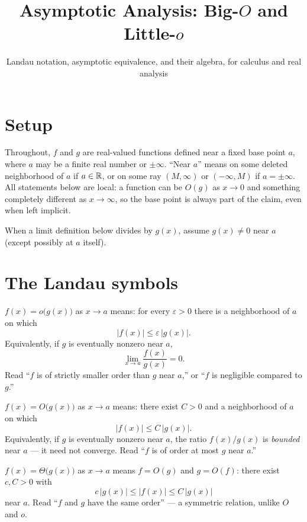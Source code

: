 \documentclass{essay}
\title{Asymptotic Analysis: Big-$O$ and Little-$o$}
\subtitle{Landau notation, asymptotic equivalence, and their algebra, for calculus and real analysis}
\author{}
\date{}
\begin{document}
\maketitle

\section{Setup}

Throughout, $f$ and $g$ are real-valued functions defined near a fixed base point $a$, where $a$ may be a finite real number or $\pm\infty$. ``Near $a$'' means on some deleted neighborhood of $a$ if $a\in\mathbb{R}$, or on some ray $(M,\infty)$ or $(-\infty,M)$ if $a=\pm\infty$. All statements below are local: a function can be $O(g)$ as $x\to 0$ and something completely different as $x\to\infty$, so the base point is always part of the claim, even when left implicit.

\begin{note}
When a limit definition below divides by $g(x)$, assume $g(x)\neq 0$ near $a$ (except possibly at $a$ itself).
\end{note}

\section{The Landau symbols}

\begin{definition}[Little-$o$]
$f(x) = o\big(g(x)\big)$ as $x\to a$ means: for every $\varepsilon>0$ there is a neighborhood of $a$ on which
\[
  |f(x)| \le \varepsilon\,|g(x)|.
\]
Equivalently, if $g$ is eventually nonzero near $a$,
\[
  \lim_{x\to a} \frac{f(x)}{g(x)} = 0.
\]
Read ``$f$ is of strictly smaller order than $g$ near $a$,'' or ``$f$ is negligible compared to $g$.''
\end{definition}

\begin{definition}[Big-$O$]
$f(x) = O\big(g(x)\big)$ as $x\to a$ means: there exist $C>0$ and a neighborhood of $a$ on which
\[
  |f(x)| \le C\,|g(x)|.
\]
Equivalently, if $g$ is eventually nonzero near $a$, the ratio $f(x)/g(x)$ is \emph{bounded} near $a$ --- it need not converge.
Read ``$f$ is of order at most $g$ near $a$.''
\end{definition}

\begin{definition}
$f(x) = \Theta\big(g(x)\big)$ as $x\to a$ means $f=O(g)$ and $g=O(f)$: there exist $c,C>0$ with
\[
  c\,|g(x)| \le |f(x)| \le C\,|g(x)|
\]
near $a$. Read ``$f$ and $g$ have the same order'' --- a symmetric relation, unlike $O$ and $o$.
\end{definition}
\end{document}
